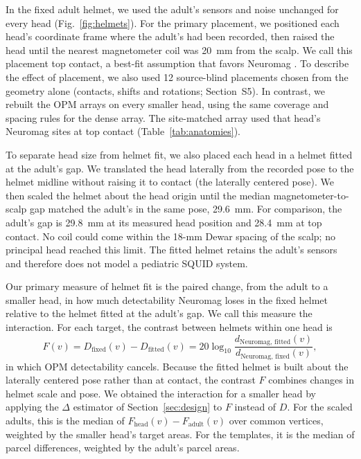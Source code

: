 \documentclass[preprint,12pt,authoryear,a4paper]{elsarticle}
\begin{document}
In the fixed adult helmet, we used the adult's sensors and noise unchanged for every head (Fig.~\ref{fig:helmets}). For the primary placement, we positioned each head's coordinate frame where the adult's had been recorded, then raised the head until the nearest magnetometer coil was 20~mm from the scalp. We call this placement top contact, a best-fit assumption that favors Neuromag \citep{gaetz2008,tesan2010}. To describe the effect of placement, we also used 12 source-blind placements chosen from the geometry alone (contacts, shifts and rotations; Section~S5). In contrast, we rebuilt the OPM arrays on every smaller head, using the same coverage and spacing rules for the dense array. The site-matched array used that head's Neuromag sites at top contact (Table~\ref{tab:anatomies}).

To separate head size from helmet fit, we also placed each head in a helmet fitted at the adult's gap. We translated the head laterally from the recorded pose to the helmet midline without raising it to contact (the laterally centered pose). We then scaled the helmet about the head origin until the median magnetometer-to-scalp gap matched the adult's in the same pose, 29.6~mm. For comparison, the adult's gap is 29.8~mm at its measured head position and 28.4~mm at top contact. No coil could come within the 18-mm Dewar spacing of the scalp; no principal head reached this limit. The fitted helmet retains the adult's sensors and therefore does not model a pediatric SQUID system.

Our primary measure of helmet fit is the paired change, from the adult to a smaller head, in how much detectability Neuromag loses in the fixed helmet relative to the helmet fitted at the adult's gap. We call this measure the interaction. For each target, the contrast between helmets within one head is
\begin{equation}
F(v) = D_{\mathrm{fixed}}(v) - D_{\mathrm{fitted}}(v) = 20\log_{10}\frac{d_{\mathrm{Neuromag,\,fitted}}(v)}{d_{\mathrm{Neuromag,\,fixed}}(v)},
\label{eq:F}
\end{equation}
in which OPM detectability cancels. Because the fitted helmet is built about the laterally centered pose rather than at contact, the contrast $F$ combines changes in helmet scale and pose. We obtained the interaction for a smaller head by applying the $\Delta$ estimator of Section~\ref{sec:design} to $F$ instead of $D$. For the scaled adults, this is the median of $F_{\mathrm{head}}(v) - F_{\mathrm{adult}}(v)$ over common vertices, weighted by the smaller head's target areas. For the templates, it is the median of parcel differences, weighted by the adult's parcel areas.
\end{document}
